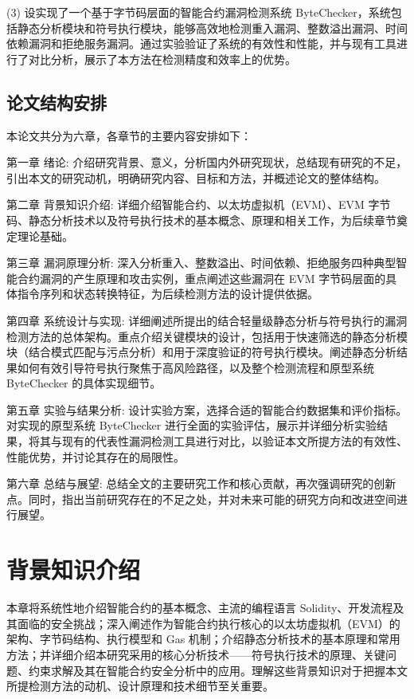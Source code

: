 \documentclass[print, master, vlined, timesmath]{DissertUESTC}
\begin{document}
(3) 设实现了一个基于字节码层面的智能合约漏洞检测系统 ByteChecker，系统包括静态分析模块和符号执行模块，能够高效地检测重入漏洞、整数溢出漏洞、时间依赖漏洞和拒绝服务漏洞。通过实验验证了系统的有效性和性能，并与现有工具进行了对比分析，展示了本方法在检测精度和效率上的优势。







\section{论文结构安排}


本论文共分为六章，各章节的主要内容安排如下：

第一章 绪论: 介绍研究背景、意义，分析国内外研究现状，总结现有研究的不足，引出本文的研究动机，明确研究内容、目标和方法，并概述论文的整体结构。

第二章 背景知识介绍: 详细介绍智能合约、以太坊虚拟机（EVM）、EVM 字节码、静态分析技术以及符号执行技术的基本概念、原理和相关工作，为后续章节奠定理论基础。

第三章 漏洞原理分析: 深入分析重入、整数溢出、时间依赖、拒绝服务四种典型智能合约漏洞的产生原理和攻击实例，重点阐述这些漏洞在 EVM 字节码层面的具体指令序列和状态转换特征，为后续检测方法的设计提供依据。

第四章 系统设计与实现: 详细阐述所提出的结合轻量级静态分析与符号执行的漏洞检测方法的总体架构。重点介绍关键模块的设计，包括用于快速筛选的静态分析模块（结合模式匹配与污点分析）和用于深度验证的符号执行模块。阐述静态分析结果如何有效引导符号执行聚焦于高风险路径，以及整个检测流程和原型系统 ByteChecker 的具体实现细节。

第五章 实验与结果分析: 设计实验方案，选择合适的智能合约数据集和评价指标。对实现的原型系统 ByteChecker 进行全面的实验评估，展示并详细分析实验结果，将其与现有的代表性漏洞检测工具进行对比，以验证本文所提方法的有效性、性能优势，并讨论其存在的局限性。

第六章 总结与展望: 总结全文的主要研究工作和核心贡献，再次强调研究的创新点。同时，指出当前研究存在的不足之处，并对未来可能的研究方向和改进空间进行展望。


\chapter{背景知识介绍}
本章将系统性地介绍智能合约的基本概念、主流的编程语言 Solidity、开发流程及其面临的安全挑战；深入阐述作为智能合约执行核心的以太坊虚拟机（EVM）的架构、字节码结构、执行模型和 Gas 机制；介绍静态分析技术的基本原理和常用方法；并详细介绍本研究采用的核心分析技术——符号执行技术的原理、关键问题、约束求解及其在智能合约安全分析中的应用。理解这些背景知识对于把握本文所提检测方法的动机、设计原理和技术细节至关重要。
\end{document}
